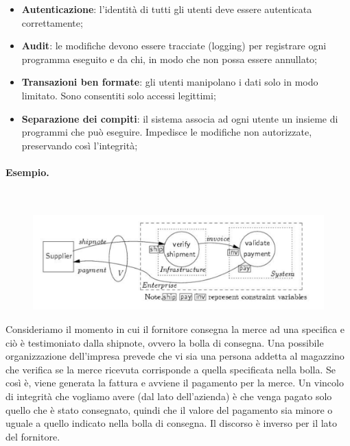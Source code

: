\begin{itemize}
      \item \textbf{Autenticazione}: l'identità di tutti gli utenti deve essere
            autenticata correttamente;
      \item \textbf{Audit}: le modifiche devono essere tracciate (logging) per registrare ogni
            programma eseguito e da chi,
            in modo che non possa essere annullato;
      \item \textbf{Transazioni ben formate}: gli utenti manipolano i dati solo in modo
            limitato. Sono consentiti
            solo accessi legittimi;
      \item \textbf{Separazione dei compiti}: il sistema associa ad ogni utente un
            insieme di programmi che
            può eseguire. Impedisce le modifiche non autorizzate, preservando
            così l'integrità;
\end{itemize}

\paragraph{Esempio.}\ \\

\begin{figure}[H]
      \centering
      \includegraphics[width=\textwidth, keepaspectratio]{capitoli/policy/imgs/clark_wilson.png}
\end{figure}

Consideriamo il momento in cui il fornitore consegna la merce ad una specifica e
ciò è testimoniato dalla shipnote, ovvero la bolla di consegna. Una possibile
organizzazione dell'impresa prevede che vi sia una persona addetta al magazzino
che verifica se la merce ricevuta corrisponde a quella specificata nella bolla.
Se così è, viene generata la fattura e avviene il pagamento per la merce. Un
vincolo di integrità che vogliamo avere (dal lato dell'azienda) è che venga
pagato solo quello che è stato consegnato, quindi che il valore del pagamento
sia minore o uguale a quello indicato nella bolla di consegna. Il discorso è
inverso per il lato del fornitore.\\

